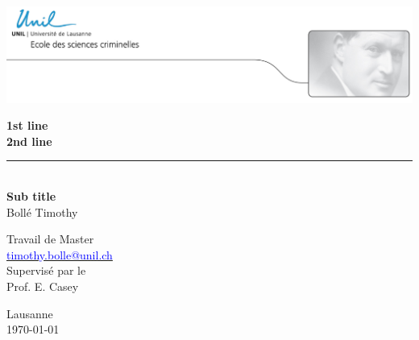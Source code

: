 
\begin{titlepage}
\parindent=0pt

\begin{center}
\includegraphics[scale=1]{figures/logo/logo_Reiss.jpg}
\end{center}
\vspace*{1cm}

\begin{center}
    \Huge %
\textbf{1st line\\ 2nd line}\\
\rule{5cm}{0.2pt}\\
\textbf{Sub title}\\
\vspace{0.5cm}
\mdseries Bollé Timothy
\end{center}

\vspace*{0.5cm}
\begin{center}\Large
Travail de Master\\
\href{mailto:timothy.bolle@unil.ch}{\small\textcolor{blue}{timothy.bolle@unil.ch}}
\\
\normalsize	Supervisé par le\\Prof. E. Casey
\end{center}
\vspace{0.3cm}

\begin{center}\large
Lausanne\\
\today
\end{center}

\end{titlepage}
\restoregeometry
